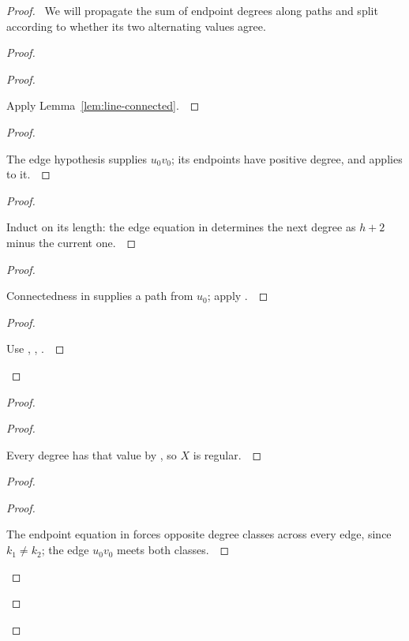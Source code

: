 \documentclass[11pt]{amsart}
\let\qed\relax
\theoremstyle{definition}
\begin{document}
\begin{proof}
\pfsketch\ We will propagate the sum of endpoint degrees along paths and split according to whether its two alternating values agree.
\begin{proof}
\begin{proof}
\pf\ \raggedright Apply Lemma~\ref{lem:line-connected}.~\qed
\end{proof}
\begin{proof}
\pf\ \raggedright The edge hypothesis supplies $u_0v_0$; its endpoints have positive degree, and  applies to it.~\qed
\end{proof}
\begin{proof}
\pf\ \raggedright Induct on its length: the edge equation in  determines the next degree as $h+2$ minus the current one.~\qed
\end{proof}
\begin{proof}
\pf\ \raggedright Connectedness in  supplies a path from $u_0$; apply .~\qed
\end{proof}
\qedstep
\begin{proof}
\pf\ \raggedright Use , , .~\qed
\end{proof}
\end{proof}
\begin{proof}
\begin{proof}
\pf\ \raggedright Every degree has that value by , so $X$ is regular.~\qed
\end{proof}
\begin{proof}
\begin{proof}
\pf\ \raggedright The endpoint equation in  forces opposite degree classes across every edge, since $k_1\ne k_2$; the edge $u_0v_0$ meets both classes.~\qed

\end{proof}
\end{proof}
\end{proof}
\end{proof}
\end{document}
